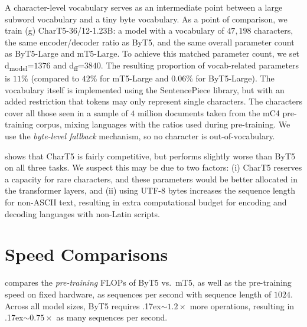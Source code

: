 \documentclass[11pt,a4paper]{article}
\newcommand{\bettertilde}{\raise.17ex\hbox{$\scriptstyle\sim$}}
\begin{document}
A character-level vocabulary serves as an intermediate point between a large subword vocabulary and a tiny byte vocabulary. As a point of comparison, we train (g) CharT5-36/12-1.23B: a model with a vocabulary of $47{,}198$ characters, the same encoder/decoder ratio as ByT5, and the same overall parameter count as ByT5-Large and mT5-Large. To achieve this matched parameter count, we set d\textsubscript{model}=$1376$ and d\textsubscript{ff}=$3840$. The resulting proportion of vocab-related parameters is $11$\% (compared to $42$\% for mT5-Large and $0.06$\% for ByT5-Large). The vocabulary itself is implemented using the SentencePiece library, but with an added restriction that tokens may only represent single characters. The characters cover all those seen in a sample of $4$ million documents taken from the mC4 pre-training corpus, mixing languages with the ratios used during pre-training. We use the \textit{byte-level fallback} mechanism, so no character is out-of-vocabulary.

 shows that CharT5 is fairly competitive, but performs slightly worse than ByT5 on all three tasks. We suspect this may be due to two factors: (i) CharT5 reserves a capacity for rare characters, and these parameters would be better allocated in the transformer layers, and (ii) using UTF-8 bytes increases the sequence length for non-ASCII text, resulting in extra computational budget for encoding and decoding languages with non-Latin scripts.

\section{Speed Comparisons}
\label{sec:speed}



 compares the \textit{pre-training} FLOPs of ByT5 vs.~mT5, as well as the pre-training speed on fixed hardware, as sequences per second with sequence length of $1024$. Across all model sizes, ByT5 requires \bettertilde{}$1.2\times$ more operations, resulting in \bettertilde{}$0.75\times$ as many sequences per second.


\end{document}
